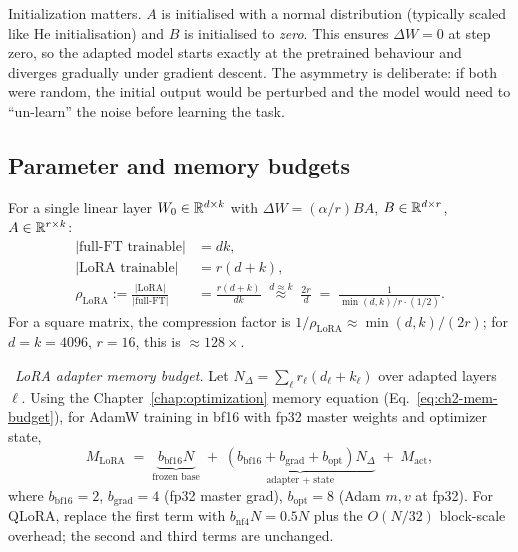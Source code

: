 Initialization matters. $A$ is initialised with a normal distribution
(typically scaled like He initialisation) and $B$ is initialised to
\emph{zero}. This ensures $\Delta W = 0$ at step zero, so the
adapted model starts exactly at the pretrained behaviour and
diverges gradually under gradient descent. The asymmetry is deliberate:
if both were random, the initial output would be perturbed and the
model would need to ``un-learn'' the noise before learning the task.

\subsection{Parameter and memory budgets}

\begin{derivation}
For a single linear layer $W_0 \in \mathbb{R}^{d\times k}$ with
$\Delta W = (\alpha/r) BA$, $B \in \mathbb{R}^{d\times r}$, $A \in \mathbb{R}^{r\times k}$:
\begin{align*}
  |\text{full-FT trainable}| &= dk, \\
  |\text{LoRA trainable}| &= r(d+k), \\
  \rho_{\mathrm{LoRA}} := \frac{|\text{LoRA}|}{|\text{full-FT}|}
  &= \frac{r(d+k)}{dk}
     \;\stackrel{d \approx k}{\approx}\; \frac{2r}{d}
     \;=\; \frac{1}{\min(d,k)/r \cdot (1/2)}.
\end{align*}
For a square matrix, the compression factor is
$1/\rho_{\mathrm{LoRA}} \approx \min(d,k)/(2r)$; for
$d=k=4096$, $r=16$, this is $\approx 128\times$.
\end{derivation}

\Ident\ \emph{LoRA adapter memory budget.} Let $N_{\Delta} = \sum_\ell r_\ell
(d_\ell + k_\ell)$ over adapted layers $\ell$. Using the Chapter~\ref{chap:optimization} memory
equation (Eq.~\eqref{eq:ch2-mem-budget}), for AdamW training in bf16
with fp32 master weights and optimizer state,
\begin{equation}
  M_{\mathrm{LoRA}}
  \;=\;
  \underbrace{b_{\mathrm{bf16}} N}_{\text{frozen base}}
  \;+\;
  \underbrace{(b_{\mathrm{bf16}} + b_{\mathrm{grad}}
            + b_{\mathrm{opt}}) N_{\Delta}}_{\text{adapter + state}}
  \;+\; M_{\mathrm{act}},
  \label{eq:ch8-lora-mem}
\end{equation}
where $b_{\mathrm{bf16}}=2$, $b_{\mathrm{grad}}=4$ (fp32 master grad),
$b_{\mathrm{opt}}=8$ (Adam $m,v$ at fp32). For QLoRA, replace the
first term with $b_{\mathrm{nf4}} N = 0.5 N$ plus the $O(N/32)$
block-scale overhead; the second and third terms are unchanged.


